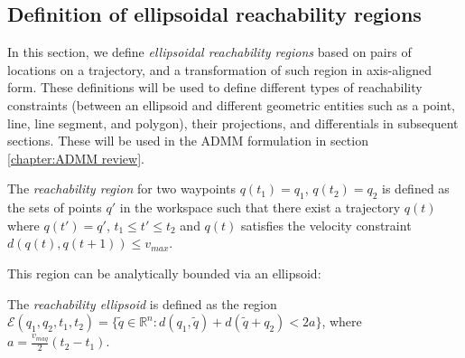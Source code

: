 \documentclass[journal]{IEEEtran}  %
\begin{document}
\subsection{Definition of ellipsoidal reachability regions}\label{sec:reachability}
  In this section, we define  \emph{ellipsoidal reachability regions} based on pairs of locations on a trajectory, and a transformation of such region in axis-aligned form. These definitions will be used to define different types of reachability constraints (between an ellipsoid and different geometric entities such as a point, line, line segment, and polygon), their projections, and differentials in subsequent sections. 
  These will be used in the ADMM formulation in section \ref{chapter:ADMM review}.


\begin{definition}\label{sec:ellipsoidal definition}
	The \emph{reachability region} for two waypoints $q(t_1)=q_1$, $q(t_2)=q_2$ is defined as the sets of points $q'$ in the workspace such that there exist a trajectory $q(t)$ where $q(t')=q'$, $t_1\leq t' \leq t_2$ and $q(t)$ satisfies the velocity constraint $d(q(t),q(t+1))\leq v_{max}$.
\end{definition}
This region can be analytically bounded via an ellipsoid:
\begin{definition}\label{def:Reachability}
	The \emph{reachability ellipsoid} is defined as the region  $\mathcal{E}(q_1,q_2,t_{1},t_{2})=\{\tilde{q}\in\mathbb{R}^n: d(q_1,\tilde{q})+d(\tilde{q}+q_2)<2a\}$, where $a=\frac{v_{maq}}{2}(t_2-t_1)$.
\end{definition}
\end{document}
